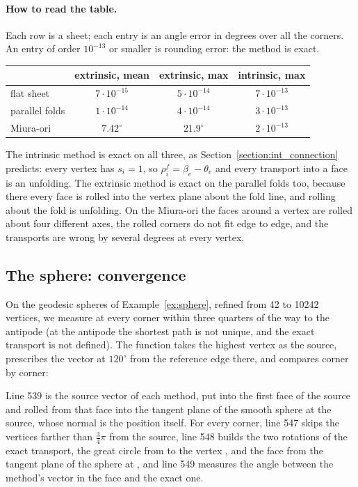\paragraph{How to read the table.} Each row is a sheet; each entry is an angle error in degrees over all the corners. An entry of order $10^{-13}$ or smaller is rounding error: the method is exact.
\begin{center}
\footnotesize
\begin{tabular}{l c c c}
\toprule
& extrinsic, mean & extrinsic, max & intrinsic, max \\
\midrule
flat sheet & $7 \cdot 10^{-15}$ & $5 \cdot 10^{-14}$ & $7 \cdot 10^{-13}$ \\
parallel folds & $1 \cdot 10^{-14}$ & $4 \cdot 10^{-14}$ & $3 \cdot 10^{-13}$ \\
Miura-ori & $7.42^\circ$ & $21.9^\circ$ & $2 \cdot 10^{-13}$ \\
\bottomrule
\end{tabular}
\end{center}
The intrinsic method is exact on all three, as Section~\ref{section:int_connection} predicts: every vertex has $s_i = 1$, so $\rho_i^f = \beta_e - \theta_e$ and every transport into a face is an unfolding. The extrinsic method is exact on the parallel folds too, because there every face is rolled into the vertex plane about the fold line, and rolling about the fold is unfolding. On the Miura-ori the faces around a vertex are rolled about four different axes, the rolled corners do not fit edge to edge, and the transports are wrong by several degrees at every vertex.

\subsection{The sphere: convergence}

On the geodesic spheres of Example~\ref{ex:sphere}, refined from 42 to 10242 vertices, we measure at every corner within three quarters of the way to the antipode (at the antipode the shortest path is not unique, and the exact transport is not defined). The function  takes the highest vertex as the source, prescribes the vector at $120^\circ$ from the reference edge there, and compares corner by corner:

Line 539 is the source vector of each method, put into the first face of the source and rolled from that face into the tangent plane of the smooth sphere at the source, whose normal is the position  itself. For every corner, line 547 skips the vertices farther than $\frac34\pi$ from the source, line 548 builds the two rotations of the exact transport,  the great circle from  to the vertex , and  the face from the tangent plane of the sphere at , and line 549 measures the angle between the method's vector in the face and the exact one.

